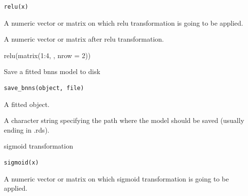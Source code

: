 \documentclass[a4paper]{book}
\begin{document}
%
\begin{Usage}
\begin{verbatim}
relu(x)
\end{verbatim}
\end{Usage}
%
\begin{Arguments}
\begin{ldescription}
\item[\code{x}] A numeric vector or matrix on which relu transformation is going to be applied.
\end{ldescription}
\end{Arguments}
%
\begin{Value}
A numeric vector or matrix after relu transformation.
\end{Value}
%
\begin{Examples}
\begin{ExampleCode}
relu(matrix(1:4, , nrow = 2))
\end{ExampleCode}
\end{Examples}
%
\begin{Description}
Save a fitted bnns model to disk
\end{Description}
%
\begin{Usage}
\begin{verbatim}
save_bnns(object, file)
\end{verbatim}
\end{Usage}
%
\begin{Arguments}
\begin{ldescription}
\item[\code{object}] A fitted  object.

\item[\code{file}] A character string specifying the path where the model should be saved (usually ending in .rds).
\end{ldescription}
\end{Arguments}
%
\begin{Description}
sigmoid transformation
\end{Description}
%
\begin{Usage}
\begin{verbatim}
sigmoid(x)
\end{verbatim}
\end{Usage}
%
\begin{Arguments}
\begin{ldescription}
\item[\code{x}] A numeric vector or matrix on which sigmoid transformation is going to be applied.
\end{ldescription}
\end{Arguments}
\end{document}
